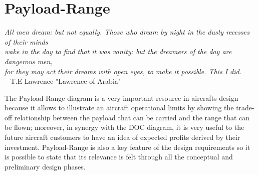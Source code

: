 \chapter{Payload-Range}

\begin{flushright}
	{\smaller
		\textit{All men dream: but not equally. Those who dream by night in the dusty recesses of their minds \\ wake in the day to find that it was vanity: but the dreamers of the day are dangerous men,\\ for they may act their dreams with open eyes, to make it possible. This I did.}\\
		-- T.E Lawrence "Lawrence of Arabia"}
\end{flushright}

\noindent
The Payload-Range diagram is a very important resource in aircrafts design because it allows to illustrate an aircraft operational limits by showing the trade-off relationship between the payload that can be carried and the range that can be flown; moreover, in synergy with the \gls{DOC} diagram, it is very useful to the future aircraft customers to have an idea of expected profits derived by their investment.
%
Payload-Range is also a key feature of the design requirements so it is possible to state that its relevance is felt through all the conceptual and preliminary design phases.
%
